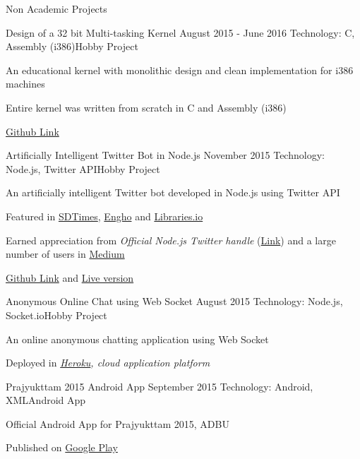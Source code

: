 \documentclass{resume}
\begin{document}
\begin{rSection}{Non Academic Projects}
	
	\begin{rSubsection}{Design of a 32 bit Multi-tasking Kernel} {August 2015 - June 2016}
		{Technology: C, Assembly (i386)}{Hobby Project}
		\item An educational kernel with monolithic design and clean implementation for i386 machines
		\item Entire kernel was written from scratch in C and Assembly (i386)
		\item \href{https://github.com/debashisbarman/minios}{Github Link}
	\end{rSubsection}
	    
	\begin{rSubsection}{Artificially Intelligent Twitter Bot in Node.js} {November 2015}
		{Technology: Node.js, Twitter API}{Hobby Project}
		\item An artificially intelligent Twitter bot developed in Node.js using Twitter API
		\item Featured in \href{https://sdtimes.com/nim-e-book-now-available-google-and-movidius-team-up-on-deep-learning-and-creating-a-twitter-bot-with-node-js-sd-times-news-digest-jan-28-2016/}{SDTimes}, \href{http://www.enhgo.com/code/program-a-twitter-bot/}{Engho} and \href{https://libraries.io/github/debashisbarman/Sofia}{Libraries.io}
		\item Earned appreciation from \textit{Official Node.js Twitter handle} (\href{https://twitter.com/nodejs/status/692736895374102528}{Link}) and a large number of users in \href{https://medium.com/@DebashisBarman/creating-a-twitter-bot-with-node-js-bea760b80bd5}{Medium}
		\item \href{https://gist.github.com/debashisbarman/bffe0f6cd3c0fd2fe40e}{Github Link} and \href{https://twitter.com/digitalsofia}{Live version}
	\end{rSubsection}
	    
	\begin{rSubsection}{Anonymous Online Chat using Web Socket} {August 2015}
		{Technology: Node.js, Socket.io}{Hobby Project}
		\item An online anonymous chatting application using Web Socket
		\item Deployed in \textit{\href{http://adda.herokuapp.com/}{Heroku}, cloud application platform}
	\end{rSubsection}
	
	\begin{rSubsection}{Prajyukttam 2015 Android App} {September 2015}
		{Technology: Android, XML}{Android App}
		\item Official Android App for Prajyukttam 2015, ADBU
		\item Published on \href{https://play.google.com/store/apps/details?id=in.edu.dbu.prajyukttam.prajyukttam2015}{Google Play}
	\end{rSubsection}
	    
\end{rSection}
\end{document}
